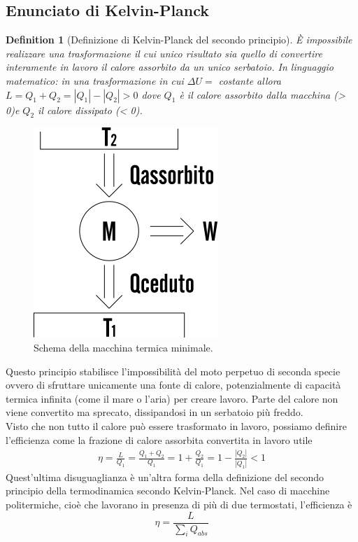 \documentclass[10pt,a4paper]{article}
\newtheorem{definition}{Definition}
\begin{document}
\subsection{Enunciato di Kelvin-Planck}
\begin{definition}[Definizione di Kelvin-Planck del secondo principio]
	È impossibile realizzare una trasformazione il cui unico risultato sia quello di convertire interamente in lavoro il calore assorbito da un unico serbatoio. In linguaggio matematico: in una trasformazione in cui $\Delta U =$ costante allora \(L = Q_1+Q_2 = |Q_1| - |Q_2|> 0\) dove $Q_1$ è il calore assorbito dalla macchina (> 0)e $Q_2$ il calore dissipato (< 0).
\end{definition}
\begin{figure}[h!]
	\centering
	\includegraphics[width=0.3\linewidth]{../images/macchina-termica}
	\caption{Schema della macchina termica minimale.}
	\label{fig:macchina-termica}
\end{figure}
\FloatBarrier
Questo principio stabilisce l'impossibilità del moto perpetuo di seconda specie ovvero di sfruttare unicamente una fonte di calore, potenzialmente di capacità termica infinita (come il mare o l'aria) per creare lavoro. Parte del calore non viene convertito ma sprecato, dissipandosi in un serbatoio più freddo. \\
Visto che non tutto il calore può essere trasformato in lavoro, possiamo definire l'efficienza come la frazione di calore assorbita convertita in lavoro utile
\begin{align*}
	\eta = \frac{L}{Q_1} = \frac{Q_1 + Q_2}{Q_1} = 1 + \frac{Q_2}{Q_1} = 1- \frac{|Q_2|}{|Q_1|}< 1
\end{align*}
Quest'ultima disuguaglianza è un'altra forma della definizione del secondo principio della termodinamica secondo Kelvin-Planck. Nel caso di macchine politermiche, cioè che lavorano in presenza di più di due termostati, l'efficienza è 
\[\eta = \frac{L}{\sum_i Q_{abs}}\]
\end{document}

